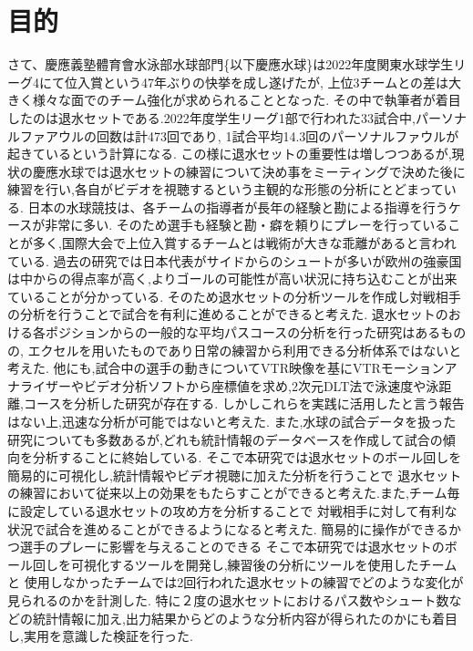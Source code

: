 \documentclass[../main.tex]{subfiles}
\begin{document}
\section{目的}
さて、慶應義塾體育會水泳部水球部門\{以下慶應水球\}は2022年度関東水球学生リーグ4にて位入賞という47年ぶりの快挙を成し遂げたが,
上位3チームとの差は大きく様々な面でのチーム強化が求められることとなった.
その中で執筆者が着目したのは退水セットである.2022年度学生リーグ1部で行われた33試合中,パーソナルファアウルの回数は計473回であり,
1試合平均14.3回のパーソナルファウルが起きているという計算になる.
この様に退水セットの重要性は増しつつあるが,現状の慶應水球では退水セットの練習について決め事をミーティングで決めた後に
練習を行い,各自がビデオを視聴するという主観的な形態の分析にとどまっている.
日本の水球競技は、各チームの指導者が長年の経験と勘による指導を行うケースが非常に多い.\cite{原朗2005水球競技の長期一貫指導型競技者育成プログラム}
そのため選手も経験と勘・癖を頼りにプレーを行っていることが多く,国際大会で上位入賞するチームとは戦術が大きな乖離があると言われている.\cite{榎本至2005水球競技のノーティカルチャート}
過去の研究では日本代表がサイドからのシュートが多いが欧州の強豪国は中からの得点率が高く,よりゴールの可能性が高い状況に持ち込むことが出来ていることが分かっている.\cite{高木英樹1988092o09}\cite{洲雅明2018水球競技における相手退水時の攻撃分析}
そのため退水セットの分析ツールを作成し対戦相手の分析を行うことで試合を有利に進めることができると考えた.
退水セットのおける各ポジションからの一般的な平均パスコースの分析を行った研究はあるものの\cite{洲雅明2016水球競技における退水時攻撃のディフェンスの崩しについて},
エクセルを用いたものであり日常の練習から利用できる分析体系ではないと考えた.
他にも,試合中の選手の動きについてVTR映像を基にVTRモーションアナライザーやビデオ分析ソフトから座標値を求め,2次元DLT法で泳速度や泳距離,コースを分析した研究が存在する.\cite{椿本1987水球のゲーム分析}\cite{清水信貴2007水球競技におけるルール改正に伴うゲーム構造の変化に関する研究}\cite{丸山博史水球競技における選手及びボールの移動からみたチームパフォーマンス}\cite{椿本昇三19839043}\cite{福中賢一女子水球選手の国際試合における試合分析}\cite{椿本昇三1987091219}
しかしこれらを実践に活用したと言う報告はない上,迅速な分析が可能ではないと考えた.
また,水球の試合データを扱った研究についても多数あるが,どれも統計情報のデータベースを作成して試合の傾向を分析することに終始している.\cite{洲雅明2013ロンドンオリンピックにおける水球競技のデータ分析}\cite{洲雅明2021水球男子日本チームの世界選手権}\cite{宮城進1985水球競技におけるゲーム分析}\cite{weko_1697_1}\cite{南隆尚1995水球競技におけるゲーム分析}\cite{宮城進1985093231}\cite{榎本至1998095c03102}\cite{高山誠1985093230}
そこで本研究では退水セットのボール回しを簡易的に可視化し,統計情報やビデオ視聴に加えた分析を行うことで
退水セットの練習において従来以上の効果をもたらすことができると考えた.また,チーム毎に設定している退水セットの攻め方を分析することで
対戦相手に対して有利な状況で試合を進めることができるようになると考えた.
簡易的に操作ができるかつ選手のプレーに影響を与えることのできる
そこで本研究では退水セットのボール回しを可視化するツールを開発し,練習後の分析にツールを使用したチームと
使用しなかったチームでは2回行われた退水セットの練習でどのような変化が見られるのかを計測した.
特に２度の退水セットにおけるパス数やシュート数などの統計情報に加え,出力結果からどのような分析内容が得られたのかにも着目し,実用を意識した検証を行った.
\end{document}
